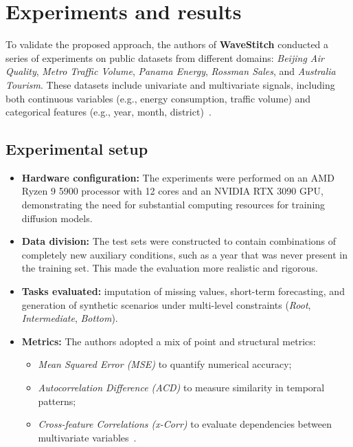 \section{Experiments and results}

To validate the proposed approach, the authors of \textbf{WaveStitch} conducted a series of experiments on public datasets from different domains:  
\emph{Beijing Air Quality}, \emph{Metro Traffic Volume}, \emph{Panama Energy}, \emph{Rossman Sales}, and \emph{Australia Tourism}.  
These datasets include univariate and multivariate signals, including both continuous variables (e.g., energy consumption, traffic volume) and categorical features (e.g., year, month, district)~\cite{wavestitch}.

\subsection{Experimental setup}
\begin{itemize}
    \item \textbf{Hardware configuration:} The experiments were performed on an AMD Ryzen 9 5900 processor with 12 cores and an NVIDIA RTX 3090 GPU, demonstrating the need for substantial computing resources for training diffusion models.  

    \item \textbf{Data division:} The test sets were constructed to contain combinations of completely new auxiliary conditions, such as a year that was never present in the training set.  
    This made the evaluation more realistic and rigorous.  

    \item \textbf{Tasks evaluated:} imputation of missing values, short-term forecasting, and generation of synthetic scenarios under multi-level constraints (\emph{Root}, \emph{Intermediate}, \emph{Bottom}).  

    \item \textbf{Metrics:} The authors adopted a mix of point and structural metrics:  
    \begin{itemize}
        \item \emph{Mean Squared Error (MSE)} to quantify numerical accuracy;  
        \item \emph{Autocorrelation Difference (ACD)} to measure similarity in temporal patterns;  
        \item \emph{Cross-feature Correlations (x-Corr)} to evaluate dependencies between multivariate variables~\cite{wavestitch}.  
    \end{itemize}
\end{itemize}

